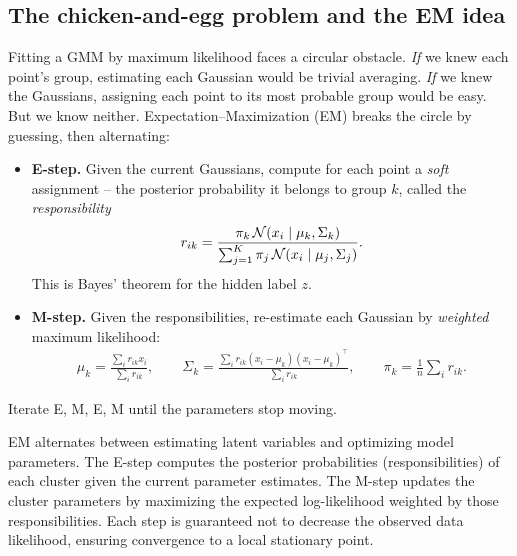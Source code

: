 \subsection{The chicken-and-egg problem and the EM idea}

Fitting a GMM by maximum likelihood faces a circular obstacle. \emph{If} we knew
each point's group, estimating each Gaussian would be trivial averaging. \emph{If}
we knew the Gaussians, assigning each point to its most probable group would be
easy. But we know neither. Expectation--Maximization (EM) breaks the circle by
guessing, then alternating:

\begin{itemize}
  \item \textbf{E-step.} Given the current Gaussians, compute for each point a
  \emph{soft} assignment -- the posterior probability it belongs to group $k$,
  called the \emph{responsibility}
  \[
    r_{ik} = \frac{\pi_k\,\mathcal{N}(x_i\mid\mu_k,\Sigma_k)}
                  {\sum_{j=1}^K \pi_j\,\mathcal{N}(x_i\mid\mu_j,\Sigma_j)}.
  \]
  This is Bayes' theorem for the hidden label $z$.
  \item \textbf{M-step.} Given the responsibilities, re-estimate each Gaussian by
  \emph{weighted} maximum likelihood:
  \begin{gather*}
    \mu_k = \frac{\sum_i r_{ik} x_i}{\sum_i r_{ik}}, \qquad
    \Sigma_k = \frac{\sum_i r_{ik}(x_i-\mu_k)(x_i-\mu_k)^\top}{\sum_i r_{ik}}, \qquad
    \pi_k = \frac{1}{n}\sum_i r_{ik}.
  \end{gather*}
\end{itemize}
Iterate E, M, E, M until the parameters stop moving.

\begin{intuitionbox}
EM alternates between estimating latent variables and optimizing model parameters. The E-step
computes the posterior probabilities (responsibilities) of each cluster given the current parameter
estimates. The M-step updates the cluster parameters by maximizing the expected log-likelihood
weighted by those responsibilities. Each step is guaranteed not to decrease the observed data
likelihood, ensuring convergence to a local stationary point.
\end{intuitionbox}

